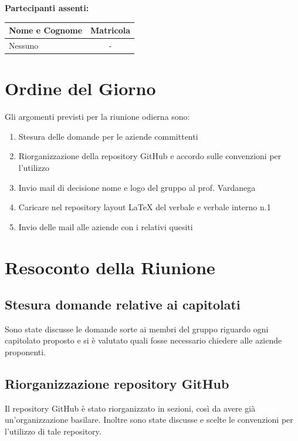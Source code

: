 \documentclass[a4paper, 11pt]{article}
\begin{document}
\vspace{0.5cm}
\textbf{Partecipanti assenti:} \\
\vspace{0.2cm}
\renewcommand{\arraystretch}{1.2}
\begin{tabularx}{0.8\textwidth}{|X|c|}
\hline
\textbf{Nome e Cognome} & \textbf{Matricola} \\ \hline
 Nessuno & - \\ \hline
\end{tabularx}

\vspace{0.5cm}
\section{Ordine del Giorno}
Gli argomenti previsti per la riunione odierna sono:
\begin{enumerate}
    \item Stesura delle domande per le aziende committenti
    \item Riorganizzazione della repository GitHub e accordo sulle convenzioni per l'utilizzo
    \item Invio mail di decisione nome e logo del gruppo al prof. Vardanega
    \item Caricare nel repository layout LaTeX del verbale e verbale interno n.1
    \item Invio delle mail alle aziende con i relativi quesiti
\end{enumerate}

\newpage
\section{Resoconto della Riunione}

\subsection{Stesura domande relative ai capitolati} 
Sono state discusse le domande sorte ai membri del gruppo riguardo ogni capitolato proposto e si è valutato quali fosse necessario chiedere alle aziende proponenti.


\subsection{Riorganizzazione repository GitHub}
Il repository GitHub è stato riorganizzato in sezioni, così da avere già un'organizzazione basilare. Inoltre sono state discusse e scelte le convenzioni per l'utilizzo di tale repository.
\end{document}
